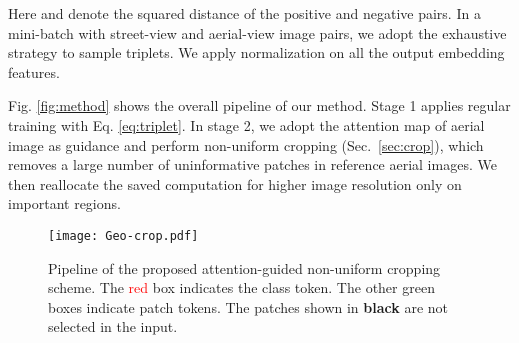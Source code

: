 \documentclass[10pt,twocolumn,letterpaper]{article}
\begin{document}
Here  and  denote the squared  distance of the positive and negative pairs. In a mini-batch with  street-view and aerial-view image pairs, we adopt the exhaustive strategy \cite{facenet} to sample  triplets. We apply  normalization on all the output embedding features. 

Fig. \ref{fig:method} shows the overall pipeline of our method. Stage 1 applies regular training with Eq. \ref{eq:triplet}. In stage 2, we adopt the attention map of aerial image as guidance and perform non-uniform cropping (Sec.~\ref{sec:crop}), which removes a large number of uninformative patches in reference aerial images. We then reallocate the saved computation for higher image resolution only on important regions. 

\begin{figure*}[!htbp]
    \centering
\texttt{[image: Geo-crop.pdf]}
    \vspace{-0.25cm}
    \caption{Pipeline of the proposed attention-guided non-uniform cropping scheme. The \textcolor{red}{red} box indicates the class token. The other green boxes indicate patch tokens. The patches shown in  \textbf{black}  are not selected in the input.}
    \label{fig:crop}
\end{figure*}
\end{document}
